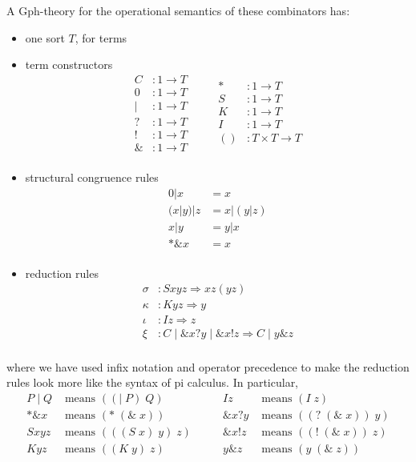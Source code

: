 \documentclass[a4paper,UKenglish]{lipics-v2016}
\begin{document}
A Gph-theory for the operational semantics of these combinators has:
\begin{itemize}
  \item one sort $T$, for terms
  \item term constructors
    \[\begin{array}{rl}
      C &: 1 \to T \\ 
      0 &: 1 \to T \\ 
      | &: 1 \to T \\ 
      ? &: 1 \to T \\ 
      ! &: 1 \to T \\ 
      \& &: 1 \to T \\ 
    \end{array}\quad\quad
    \begin{array}{rl}
      * &: 1 \to T \\ 
      S &: 1 \to T \\ 
      K &: 1 \to T \\ 
      I &: 1 \to T \\ 
      () &: T \times T \to T \\ 
    \end{array}\]
  \item structural congruence rules
    \[\begin{array}{rl}
      0|x &= x \\
      (x|y)|z &= x|(y|z) \\
      x|y &= y|x \\
      *\&x &= x \\
    \end{array}\]
  \item reduction rules
    \[\begin{array}{rl}
      \sigma &: Sxyz \Rightarrow xz(yz) \\ 
      \kappa &: Kyz \Rightarrow y \\ 
      \iota &: Iz \Rightarrow z \\ 
      \xi &: C\;|\;\&x?y\;|\;\&x!z \Rightarrow C\;|\;y\&z \\ 
    \end{array}\]
\end{itemize}
where we have used infix notation and operator precedence to make the reduction rules look more like the syntax of pi calculus.  In particular, 
\[\begin{array}{rl}
  P\;|\;Q &\mbox{ means } ((|\; P)\; Q)\\
  *\&x &\mbox{ means } (*\; (\&\; x))\\  
  Sxyz &\mbox{ means } (((S\; x)\; y)\; z)\\
  Kyz &\mbox{ means } ((K\; y)\; z)\\
\end{array}\quad\quad
\begin{array}{rl}
  Iz &\mbox{ means } (I\; z)\\
  \&x?y &\mbox{ means } ((?\; (\&\; x))\; y)\\
  \&x!z &\mbox{ means } ((!\; (\&\; x))\; z)\\
  y\&z &\mbox{ means } (y\; (\&\; z))\\
\end{array}\]
\end{document}
